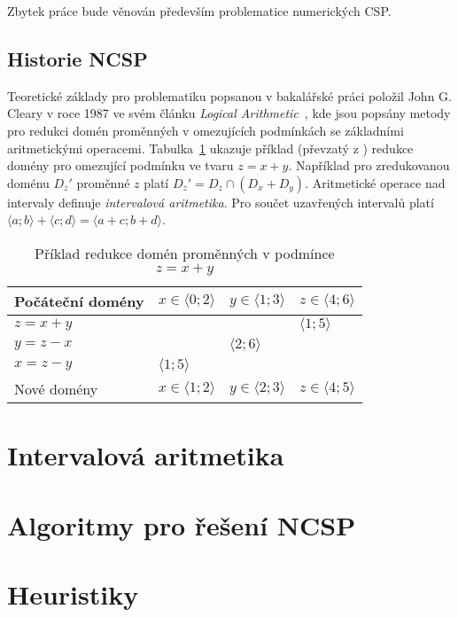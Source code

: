 Zbytek práce bude věnován především problematice numerických CSP.

\subsection{Historie NCSP}

Teoretické základy pro problematiku popsanou v bakalářské práci položil John G. Cleary v roce 1987 ve svém článku \emph{Logical Arithmetic}~\cite{cleary87}, kde jsou popsány metody pro redukci domén proměnných v omezujících podmínkách se základními aritmetickými operacemi. Tabulka~\ref{narrowingTable} ukazuje příklad (převzatý z \cite{cleary87}) redukce domény pro omezující podmínku ve tvaru $z = x + y$. Například pro zredukovanou doménu $D_z'$ proměnné $z$ platí $D_z' = D_z \cap (D_x + D_y)$. Aritmetické operace nad intervaly definuje \emph{intervalová aritmetika}. Pro součet uzavřených intervalů platí $\langle a;b \rangle + \langle c;d \rangle = \langle a + c ; b + d \rangle$.

\begin{table}[ht]
\centering
\label{narrowingTable}
\begin{tabular}{|l|l|l|l|}
\hline
 Počáteční domény & $x \in \langle 0;2 \rangle$ & $y \in \langle 1;3 \rangle$ & $z \in \langle 4;6 \rangle$  \\ \hline
 $z = x+y$  &  & &  $\langle 1;5 \rangle$  \\ \hline
 $y = z-x$  & & $\langle 2;6 \rangle$  &  \\ \hline
 $x = z-y$  & $\langle 1;5 \rangle$  &  &  \\ \hline
 Nové domény & $x \in \langle 1;2 \rangle$ & $y \in \langle 2;3 \rangle$ & $z \in \langle 4;5 \rangle$ \\ \hline
\end{tabular}
\caption{Příklad redukce domén proměnných v podmínce $z = x + y$}
\end{table}

\section{Intervalová aritmetika}

\section{Algoritmy pro řešení NCSP}
\section{Heuristiky}
